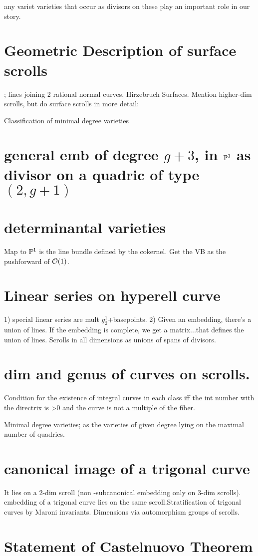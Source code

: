 any variet varieties that occur as divisors on these play an important role in our story.
\section{ Geometric Description of surface scrolls}; lines joining 2 rational normal curves, Hirzebruch Surfaces. Mention higher-dim scrolls, but do surface scrolls in more detail: 


\begin{fact} 
 Classification of minimal degree varieties
\end{fact}
 
  
\section{ general emb of degree $g+3$, in ${\mathbb P}^3$ as divisor on a quadric of type $(2,g+1)$}

\section{ determinantal varieties}
  Map to ${\mathbb P}^1$ is the line bundle defined by the cokernel. Get the VB as the pushforward of ${\mathcal O}(1)$.

\section{ Linear series on hyperell curve}
 1) special linear series are mult $g^1_2$+basepoints. 2) Given an embedding, there's a union of lines. If the embedding is complete, we get a matrix...that defines the union of lines. Scrolls in all dimensions as unions of spans of divisors.
 

\section{ dim and genus of curves on scrolls.} Condition for the existence of integral curves in each class iff the int number with the directrix is >0 and the curve is not a multiple of the fiber. 

 
 
\begin{fact}
 Minimal degree varieties; as the varieties of given degree lying on the maximal number of quadrics.
\end{fact}

\section{ canonical image of a trigonal curve}
It lies on a 2-dim scroll (non -subcanonical embedding only on 3-dim scrolls).  embedding of a trigonal curve lies on the same scroll.Stratification of trigonal curves by Maroni invariants. Dimensions via automorphism groups of scrolls.
 
\section{ Statement of Castelnuovo Theorem}




